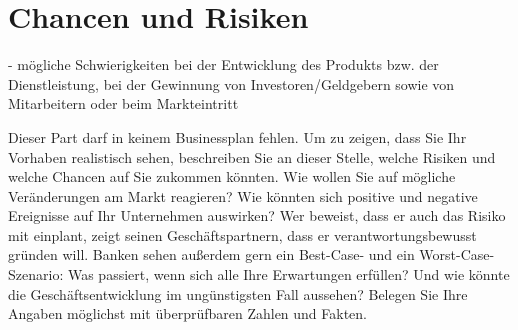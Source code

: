 \section{Chancen und Risiken}



- mögliche Schwierigkeiten bei der Entwicklung des Produkts bzw. der Dienstleistung, bei der Gewinnung von Investoren/Geldgebern sowie von Mitarbeitern oder beim Markteintritt 

Dieser Part darf in keinem Businessplan fehlen. Um zu zeigen, dass Sie Ihr Vorhaben realistisch sehen, beschreiben Sie an dieser Stelle, welche Risiken und welche Chancen auf Sie zukommen könnten. Wie wollen Sie auf mögliche Veränderungen am Markt reagieren? Wie könnten sich positive und negative Ereignisse auf Ihr Unternehmen auswirken? Wer beweist, dass er auch das Risiko mit einplant, zeigt seinen Geschäftspartnern, dass er verantwortungsbewusst gründen will. Banken sehen außerdem gern ein Best-Case- und ein Worst-Case-Szenario: Was passiert, wenn sich alle Ihre Erwartungen erfüllen? Und wie könnte die Geschäftsentwicklung im ungünstigsten Fall aussehen? Belegen Sie Ihre Angaben möglichst mit überprüfbaren Zahlen und Fakten.
